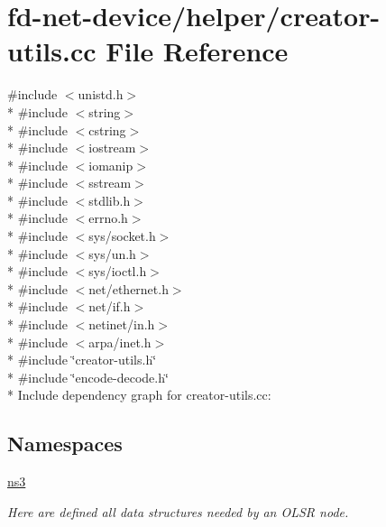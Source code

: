 \hypertarget{creator-utils_8cc}{}\section{fd-\/net-\/device/helper/creator-\/utils.cc File Reference}
\label{creator-utils_8cc}
{\ttfamily \#include $<$unistd.\+h$>$}\\*
{\ttfamily \#include $<$string$>$}\\*
{\ttfamily \#include $<$cstring$>$}\\*
{\ttfamily \#include $<$iostream$>$}\\*
{\ttfamily \#include $<$iomanip$>$}\\*
{\ttfamily \#include $<$sstream$>$}\\*
{\ttfamily \#include $<$stdlib.\+h$>$}\\*
{\ttfamily \#include $<$errno.\+h$>$}\\*
{\ttfamily \#include $<$sys/socket.\+h$>$}\\*
{\ttfamily \#include $<$sys/un.\+h$>$}\\*
{\ttfamily \#include $<$sys/ioctl.\+h$>$}\\*
{\ttfamily \#include $<$net/ethernet.\+h$>$}\\*
{\ttfamily \#include $<$net/if.\+h$>$}\\*
{\ttfamily \#include $<$netinet/in.\+h$>$}\\*
{\ttfamily \#include $<$arpa/inet.\+h$>$}\\*
{\ttfamily \#include \char`\"{}creator-\/utils.\+h\char`\"{}}\\*
{\ttfamily \#include \char`\"{}encode-\/decode.\+h\char`\"{}}\\*
Include dependency graph for creator-\/utils.cc\+:
\subsection*{Namespaces}
\begin{DoxyCompactItemize}
\item 
 \hyperlink{namespacens3}{ns3}
\begin{DoxyCompactList}\small\item\em Here are defined all data structures needed by an O\+L\+SR node. \end{DoxyCompactList}\end{DoxyCompactItemize}
